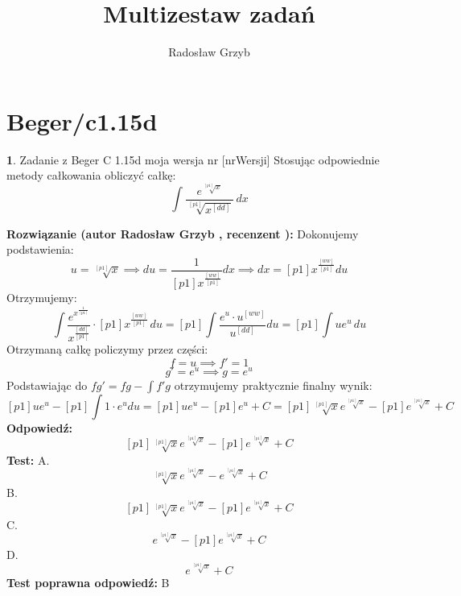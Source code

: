 \documentclass[12pt, a4paper]{article}
\title{Multizestaw zadań}
\author{Radosław Grzyb}
\date{}
\theoremstyle{definition} %
\newtheorem{zad}{}
\newcommand{\kategoria}[1]{\section{#1}} %
\newcommand{\zadStart}[1]{\begin{zad}#1\newline} %
\newcommand{\zadStop}{\end{zad}}   %
\newcommand{\rozwStart}[2]{\noindent \textbf{Rozwiązanie (autor #1 , recenzent #2): }\newline} %
\newcommand{\rozwStop}{\newline}                                            %
\newcommand{\odpStart}{\noindent \textbf{Odpowiedź:}\newline}    %
\newcommand{\odpStop}{\newline}                                             %
\newcommand{\testStart}{\noindent \textbf{Test:}\newline} %
\newcommand{\testStop}{\newline} %
\newcommand{\kluczStart}{\noindent \textbf{Test poprawna odpowiedź:}\newline} %
\newcommand{\kluczStop}{\newline} %
\begin{document}
\maketitle
\kategoria{Beger/c1.15d}
\zadStart{Zadanie z Beger C 1.15d moja wersja nr [nrWersji]}
Stosując odpowiednie metody całkowania obliczyć całkę:
$$\int \frac{e^{\sqrt[[p1]]{x}}}{\sqrt[[p1]]{x^{[dd]}}}\,dx$$
\zadStop
\rozwStart{Radosław Grzyb}{}
Dokonujemy podstawienia:
$$u=\sqrt[[p1]]{x}\implies du=\frac{1}{[p1]x^{\frac{[ww]}{[p1]}}}dx\implies dx=[p1]x^{\frac{[ww]}{[p1]}}du$$
Otrzymujemy:
$$\int \frac{e^{x^{\frac{1}{[p1]}}}}{x^{\frac{[dd]}{[p1]}}}\cdot[p1]x^{\frac{[ww]}{[p1]}}\,du=[p1]\int\frac{e^u\cdot u^{[ww]}}{u^{[dd]}}du=[p1]\int ue^u \,du$$
Otrzymaną całkę policzymy przez części:
$$f=u \implies f'=1$$
$$g'=e^u \implies g=e^u$$
Podstawiając do $fg'=fg-\int f'g$ otrzymujemy praktycznie finalny wynik: 
$$[p1]ue^u-[p1]\int1\cdot e^u du=[p1]ue^u-[p1]e^u+C=[p1]\sqrt[[p1]]{x}e^{\sqrt[[p1]]{x}}-[p1]e^{\sqrt[[p1]]{x}}+C$$
\rozwStop
\odpStart
$$[p1]\sqrt[[p1]]{x}e^{\sqrt[[p1]]{x}}-[p1]e^{\sqrt[[p1]]{x}}+C$$
\odpStop
\testStart
A.$$\sqrt[[p1]]{x}e^{\sqrt[[p1]]{x}}-e^{\sqrt[[p1]]{x}}+C$$
B.$$[p1]\sqrt[[p1]]{x}e^{\sqrt[[p1]]{x}}-[p1]e^{\sqrt[[p1]]{x}}+C$$
C.$$e^{\sqrt[[p1]]{x}}-[p1]e^{\sqrt[[p1]]{x}}+C$$
D.$$e^{\sqrt[[p1]]{x}}+C$$
\testStop
\kluczStart
B
\kluczStop
\end{document}
